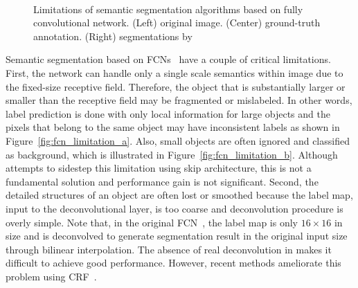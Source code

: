 \documentclass[10pt,twocolumn,letterpaper]{article}
\begin{document}
\begin{figure}[t]
\centering
{} \\ \vspace{-0.2cm}
\caption{Limitations of semantic segmentation algorithms based on fully convolutional network. (Left) original image. (Center) ground-truth annotation. (Right) segmentations by \cite{Fcn} }
\label{fig:fcn_limitation}
\end{figure}
Semantic segmentation based on FCNs~\cite{Deeplabcrf,Fcn} have a couple of critical limitations.
First, the network can handle only a single scale semantics within image due to the fixed-size receptive field.
Therefore, the object that is substantially larger or smaller than the receptive field may be fragmented or mislabeled.
In other words, label prediction is done with only local information for large objects and the pixels that belong to the same object may have inconsistent labels as shown in Figure~\ref{fig:fcn_limitation_a}.
Also, small objects are often ignored and classified as background, which is illustrated in Figure~\ref{fig:fcn_limitation_b}.
Although \cite{Fcn} attempts to sidestep this limitation using skip architecture, this is not a fundamental solution and performance gain is not significant.
Second, the detailed structures of an object are often lost or smoothed because the label map, input to the deconvolutional layer, is too coarse and deconvolution procedure is overly simple.
Note that, in the original FCN~\cite{Fcn}, the label map is only $16 \times 16$ in size and is deconvolved to generate segmentation result in the original input size through bilinear interpolation.
The absence of real deconvolution in \cite{Deeplabcrf,Fcn} makes it difficult to achieve good performance.
However, recent methods ameliorate this problem using CRF~\cite{Fullycrf}.

\iffalse
First is trade-off between accuracy and detail. 
Classification CNN generate single label prediction from input with single receptive field.
Therefore, to obtain the detail segmentation result, network have to predict every pixel of the object seperately.
This strategy forces the network to make prediction with local information only.
label the object without looking at the whole object but only looking at its part to obtain detail segmentation result,. 
Second is weakness in cluttered background or occluded object. It is very difficult to distinguish target object and cluttered background texture if we focusing on that part alone, because there might be almost no difference in their looking. 
\fi
\end{document}
